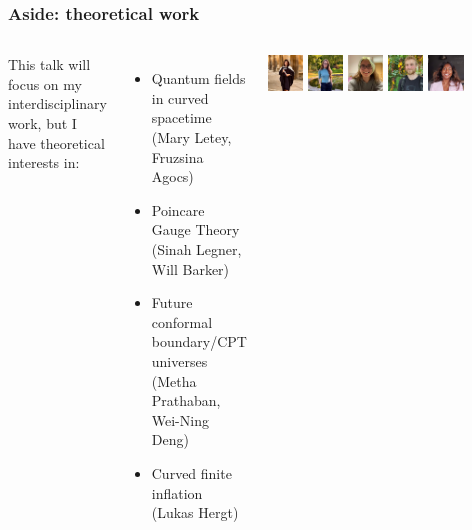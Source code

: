 \documentclass[aspectratio=169, handout]{beamer}
\begin{document}
\begin{frame}
    \frametitle{Aside: theoretical work}
    \begin{columns}

        This talk will focus on my interdisciplinary work, but I have theoretical interests in:
        \begin{itemize}
            \item Quantum fields in curved spacetime \\\hfill (Mary Letey, Fruzsina Agocs)
            \item Poincare Gauge Theory \\\hfill (Sinah Legner, Will Barker)
            \item Future conformal boundary/CPT universes \\\hfill (Metha Prathaban, Wei-Ning Deng)
            \item Curved finite inflation \hfill (Lukas Hergt)
        \end{itemize}
        \includegraphics[width=0.145\textwidth]{figures/students/mary_letey.jpg}%
        \includegraphics[width=0.145\textwidth]{figures/students/fruzsina_agocs.jpg}%
        \includegraphics[width=0.145\textwidth]{figures/students/sinah_legner.jpg}%
        \includegraphics[width=0.145\textwidth]{figures/students/will_barker.jpg}%
        \includegraphics[width=0.145\textwidth]{figures/students/metha_prathaban.jpg}%

\end{columns}
\end{frame}
\end{document}
